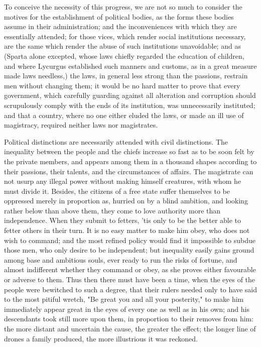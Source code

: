 \documentclass[11pt,twocolumn]{ltugboat}
\begin{document}
To conceive the necessity of this progress, we are not so much to
consider the motives for the establishment of political bodies, as the
forms these bodies assume in their administration; and the
inconveniences with which they are essentially attended; for those
vices, which render social institutions necessary, are the same which
render the abuse of such institutions unavoidable; and as (Sparta
alone excepted, whose laws chiefly regarded the education of children,
and where Lycurgus established such manners and customs, as in a great
measure made laws needless,) the laws, in general less strong than the
passions, restrain men without changing them; it would be no hard
matter to prove that every government, which carefully guarding
against all alteration and corruption should scrupulously comply with
the ends of its institution, was unnecessarily instituted; and that a
country, where no one either eluded the laws, or made an ill use of
magistracy, required neither laws nor magistrates.

Political distinctions are necessarily attended with civil
distinctions. The inequality between the people and the chiefs
increase so fast as to be soon felt by the private members, and
appears among them in a thousand shapes according to their passions,
their talents, and the circumstances of affairs. The magistrate can
not usurp any illegal power without making himself creatures, with
whom he must divide it. Besides, the citizens of a free state suffer
themselves to be oppressed merely in proportion as, hurried on by a
blind ambition, and looking rather below than above them, they come to
love authority more than independence. When they submit to fetters,
'tis only to be the better able to fetter others in their turn. It is
no easy matter to make him obey, who does not wish to command; and the
most refined policy would find it impossible to subdue those men, who
only desire to be independent; but inequality easily gains ground
among base and ambitious souls, ever ready to run the risks of
fortune, and almost indifferent whether they command or obey, as she
proves either favourable or adverse to them. Thus then there must have
been a time, when the eyes of the people were bewitched to such a
degree, that their rulers needed only to have said to the most pitiful
wretch, "Be great you and all your posterity," to make him immediately
appear great in the eyes of every one as well as in his own; and his
descendants took still more upon them, in proportion to their removes
from him: the more distant and uncertain the cause, the greater the
effect; the longer line of drones a family produced, the more
illustrious it was reckoned.
\end{document}
